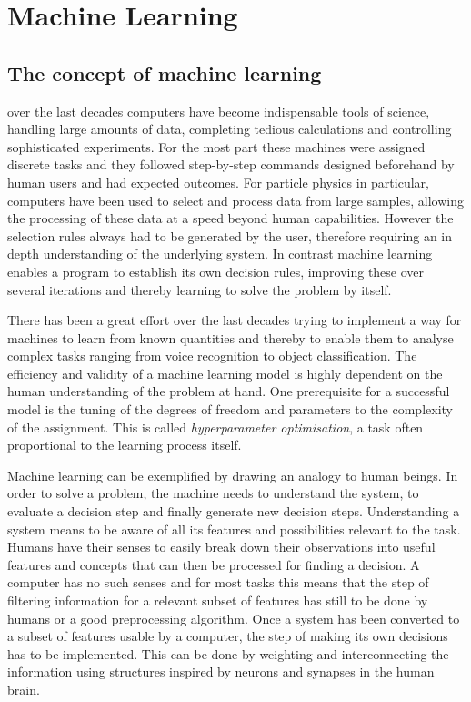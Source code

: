 \chapter{Machine Learning}
\label{chp:ml}

\section{The concept of machine learning}

over the last decades computers have become indispensable tools of science, handling large amounts of data, completing tedious calculations and controlling sophisticated experiments. For the most part these  machines were assigned discrete tasks and they followed step-by-step commands designed beforehand by human users and had expected outcomes. 
For particle physics in particular, computers have been used to select and process data from large samples, allowing the processing of these data at a speed beyond human capabilities. However the selection rules always had to be generated by the user, therefore requiring an in depth understanding of the underlying system. In contrast machine learning enables a program to establish its own decision rules, improving these over several iterations and thereby learning to solve the problem by itself.

There has been a great effort over the last decades trying to implement a way for machines to learn from known quantities and thereby to enable them to analyse complex tasks ranging from voice recognition to object classification.
The efficiency and validity of a machine learning model is highly dependent on the human understanding of the problem at hand. One prerequisite for a successful model is the tuning of the degrees of freedom and parameters to the complexity of the assignment. This is called \emph{hyperparameter optimisation}, a task often proportional to the learning process itself.


Machine learning can be exemplified by drawing an analogy to human beings. In order to solve a problem, the machine needs to understand the system, to evaluate a decision step and finally generate new decision steps.
Understanding a system means to be aware of all its features and possibilities relevant to the task. Humans have their senses to easily break down their observations into useful features and concepts that can then be processed for finding a decision. A computer has no such senses and for most tasks this means that the step of filtering information for a relevant subset of features has still to be done by humans or a good preprocessing algorithm.
Once a system has been converted to a subset of features usable by a computer, the step of making its own decisions has to be implemented. This can be done by weighting and interconnecting the information using structures inspired by neurons and synapses in the human brain. 


